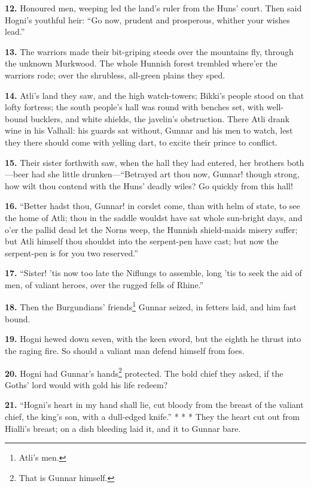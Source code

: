 \textbf{12.} Honoured men, weeping led the land's ruler from the Huns'
court. Then said Hogni's youthful heir: ``Go now, prudent and
prosperous, whither your wishes lead.''

\textbf{13.} The warriors made their bit-griping steeds over the mountains
fly, through the unknown Murkwood. The whole Hunnish forest trembled
where'er the warriors rode; over the shrubless, all-green plains they
sped.

\textbf{14.} Atli's land they saw, and the high watch-towers; Bikki's people
stood on that lofty fortress; the south people's hall was round with
benches set, with well-bound bucklers, and white shields, the
javelin's obstruction. There Atli drank wine in his Valhall: his
guards sat without, Gunnar and his men to watch, lest they there
should come with yelling dart, to excite their prince to conflict.

\textbf{15.} Their sister forthwith saw, when the hall they had entered, her
brothers both—beer had she little drunken—``Betrayed art thou now,
Gunnar! though strong, how wilt thou contend with the Huns' deadly
wiles? Go quickly from this hall!

\textbf{16.} ``Better hadst thou, Gunnar! in corslet come, than with helm of
state, to see the home of Atli; thou in the saddle wouldst have sat
whole sun-bright days, and o'er the pallid dead let the Norns weep,
the Hunnish shield-maids misery suffer; but Atli himself thou shouldst
into the serpent-pen have cast; but now the serpent-pen is for you two
reserved.''

\textbf{17.} ``Sister! 'tis now too late the Niflungs to assemble, long 'tis
to seek the aid of men, of valiant heroes, over the rugged fells of
Rhine.''

\textbf{18.} Then the Burgundians' friends\footnote{Atli's men.} Gunnar seized, in fetters
laid, and him fast bound.

\textbf{19.} Hogni hewed down seven, with the keen sword, but the eighth he
thrust into the raging fire. So should a valiant man defend himself
from foes.

\textbf{20.} Hogni had Gunnar's hands\footnote{That is Gunnar himself.} protected. The bold chief they
asked, if the Goths' lord would with gold his life redeem?

\textbf{21.} ``Hogni's heart in my hand shall lie, cut bloody from the breast
of the valiant chief, the king's son, with a dull-edged knife.'' * * *
They the heart cut out from Hialli's breast; on a dish bleeding laid
it, and it to Gunnar bare.

